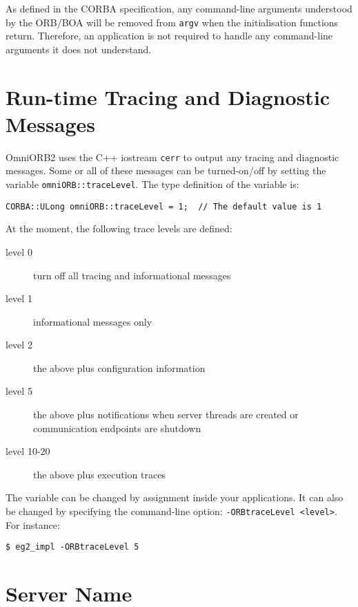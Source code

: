 \documentclass[11pt,twoside,onecolumn]{book}
\begin{document}
As defined in the CORBA specification, any command-line arguments
understood by the ORB/BOA will be removed from {\tt argv} when the
initialisation functions return. Therefore, an application is not required
to handle any command-line arguments it does not understand.

\section{Run-time Tracing and Diagnostic Messages}
\label{rttrace}

OmniORB2 uses the C++ iostream {\tt cerr} to output any tracing and
diagnostic messages. Some or all of these messages can be turned-{on/off} by
setting the variable {\tt omniORB::traceLevel}. The type definition of
the variable is:

{\small
\begin{verbatim}
CORBA::ULong omniORB::traceLevel = 1;  // The default value is 1
\end{verbatim}
}

At the moment, the following trace levels are defined:

\begin{description}

\item[level 0] turn off all tracing and informational messages
\item[level 1] informational messages only
\item[level 2] the above plus configuration information
\item[level 5] the above plus notifications when server threads are created
or communication endpoints are shutdown
\item[level 10-20] the above plus execution traces

\end{description}

The variable can be changed by assignment inside your applications. It can
also be changed by specifying the command-line option: {\tt -ORBtraceLevel
<level>}. For instance:

{\small
\begin{verbatim}
$ eg2_impl -ORBtraceLevel 5
\end{verbatim}
}


\section{Server Name}
\label{sec_servername}
\end{document}
